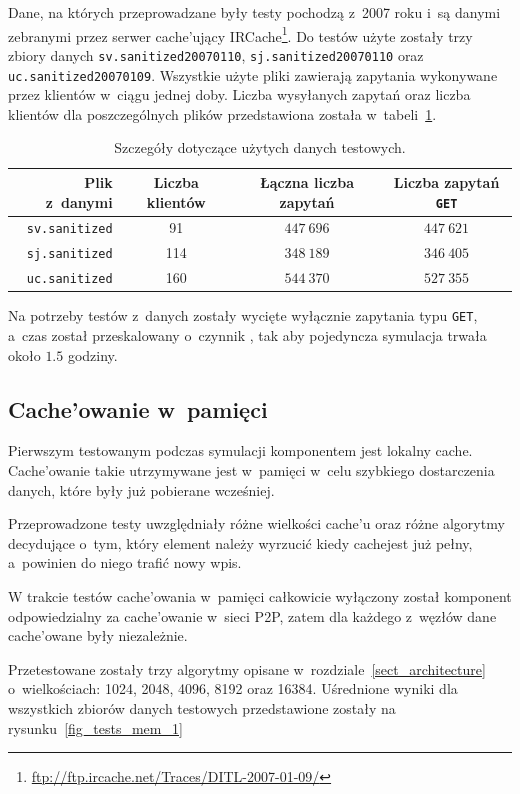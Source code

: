 \documentclass[a4paper,11pt]{scrartcl}
\newcommand{\f}{\texttt}
\newcommand{\s}{ }
\newcommand{\kesz}{cache}
\newcommand{\keszu}{cache'u}
\newcommand{\keszujacy}{cache'ujący}
\newcommand{\keszowania}{cache'owania}
\newcommand{\keszowane}{cache'owane}
\newcommand{\keszowanie}{cache'owanie}
\newcommand{\Keszowanie}{Cache'owanie}
\begin{document}
Dane, na których przeprowadzane były testy pochodzą z~2007 roku i~są danymi zebranymi przez serwer \keszujacy\s IRCache\footnote{\url{ftp://ftp.ircache.net/Traces/DITL-2007-01-09/}}. Do testów użyte zostały trzy zbiory danych \f{sv.sanitized20070110}, \f{sj.sanitized20070110} oraz \f{uc.sanitized20070109}.
Wszystkie użyte pliki zawierają zapytania wykonywane przez klientów w~ciągu jednej doby. Liczba wysyłanych zapytań oraz liczba klientów dla poszczególnych plików przedstawiona została w~tabeli~\ref{tab_testdata}.

\begin{table}[h!]
\centering
\begin{tabular}{r c c c}
Plik z~danymi & Liczba klientów & Łączna liczba zapytań & Liczba zapytań \f{GET}\\
\hline
\f{sv.sanitized} & 91 & $447~696$ & $447~621$\\
\f{sj.sanitized} & 114 & $348~189$ & $346~405$\\
\f{uc.sanitized} & 160 & $544~370$ & $527~355$\\
\end{tabular}
\caption{Szczegóły dotyczące użytych danych testowych.}
\label{tab_testdata}
\end{table}

Na potrzeby testów z~danych zostały wycięte wyłącznie zapytania typu \f{GET}, a~czas został przeskalowany o~czynnik , tak aby pojedyncza symulacja trwała około $1.5$ godziny.

\subsection{\Keszowanie\s w~pamięci}
\label{sect_tests_mem}
Pierwszym testowanym podczas symulacji komponentem jest lokalny \kesz. \Keszowanie\s takie utrzymywane jest w~pamięci w~celu szybkiego dostarczenia danych, które były już pobierane wcześniej.

Przeprowadzone testy uwzględniały różne wielkości \keszu\s oraz różne algorytmy decydujące o~tym, który element należy wyrzucić kiedy \kesz jest już pełny, a~powinien do niego trafić nowy wpis.

W trakcie testów \keszowania\s w~pamięci całkowicie wyłączony został komponent odpowiedzialny za \keszowanie\s w~sieci P2P, zatem dla każdego z~węzłów dane \keszowane\s były niezależnie.

Przetestowane zostały trzy algorytmy opisane w~rozdziale~\ref{sect_architecture} o~wielkościach: 1024, 2048, 4096, 8192 oraz 16384. Uśrednione wyniki dla wszystkich zbiorów danych testowych przedstawione zostały na rysunku~\ref{fig_tests_mem_1}
\end{document}
